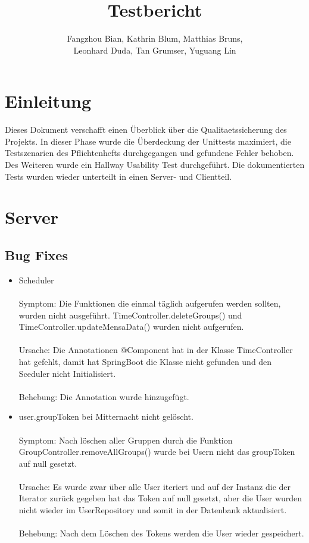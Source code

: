 \documentclass[a4paper]{scrreprt}
\begin{document}
\title{Testbericht}
\author{Fangzhou Bian, Kathrin Blum, Matthias Bruns, \\Leonhard Duda, Tan Grumser, Yuguang Lin}
\maketitle
\tableofcontents



\chapter{Einleitung}

Dieses Dokument verschafft einen Überblick über die \Gls{Qualitaetssicherung} des Projekts. In dieser Phase wurde die Überdeckung der \Gls{Unittest}s maximiert, die Testszenarien des Pflichtenhefts durchgegangen und gefundene Fehler behoben. Des Weiteren wurde ein \Gls{Hallway Usability Test} durchgeführt. Die dokumentierten Tests wurden wieder unterteilt in einen Server- und Clientteil.

\chapter{Server}

\section{Bug Fixes}

\begin{itemize}
\item Scheduler\\ \\
Symptom: Die Funktionen die einmal täglich aufgerufen werden sollten, wurden nicht ausgeführt. TimeController.deleteGroups() und TimeController.updateMensaData() wurden nicht aufgerufen.\\ \\
Ursache: Die Annotationen @Component hat in der Klasse TimeController hat gefehlt, damit hat SpringBoot die Klasse nicht gefunden und den Sceduler nicht Initialisiert.\\ \\
Behebung:  Die Annotation wurde hinzugefügt.

\item user.groupToken bei Mitternacht nicht gelöscht.\\ \\
Symptom: Nach löschen aller Gruppen durch die Funktion GroupController.removeAllGroups() wurde bei Usern nicht das groupToken auf null gesetzt.\\ \\
Ursache: Es wurde zwar über alle User iteriert und auf der Instanz die der Iterator zurück gegeben hat das Token auf null gesetzt, aber die User wurden nicht wieder im UserRepository und somit in der Datenbank aktualisiert.\\ \\
Behebung: Nach dem Löschen des Tokens werden die User wieder gespeichert.

\end{itemize}
\end{document}
